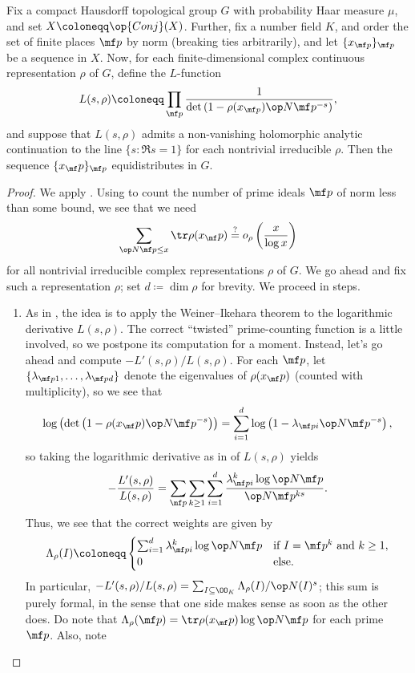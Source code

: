 \documentclass[../thesis.tex]{subfiles}
\begin{document}
\begin{proposition}[Serre] \label{prop:equi-by-l-func}
	Fix a compact Hausdorff topological group $G$ with probability Haar measure $\mu$, and set $X\coloneqq\op{Conj}(X)$. Further, fix a number field $K$, and order the set of finite places $\mf p$ by norm (breaking ties arbitrarily), and let $\{x_{\mf p}\}_{\mf p}$ be a sequence in $X$. Now, for each finite-dimensional complex continuous representation $\rho$ of $G$, define the $L$-function
	\[L(s,\rho)\coloneqq\prod_{\mf p}\frac1{\det\left(1-\rho(x_{\mf p})\op N\mf p^{-s}\right)},\]
	and suppose that $L(s,\rho)$ admits a non-vanishing holomorphic analytic continuation to the line $\{s:\Re s=1\}$ for each nontrivial irreducible $\rho$. Then the sequence $\{x_\mf p\}_{\mf p}$ equidistributes in $G$.
\end{proposition}
\begin{proof}
	We apply . Using  to count the number of prime ideals $\mf p$ of norm less than some bound, we see that we need
	\[\sum_{\op N\mf p\le x}\tr\rho(x_\mf p)\stackrel?=o_\rho\left(\frac x{\log x}\right)\]
	for all nontrivial irreducible complex representations $\rho$ of $G$. We go ahead and fix such a representation $\rho$; set $d\coloneqq\dim\rho$ for brevity. We proceed in steps.
	\begin{enumerate}
		\item As in , the idea is to apply the Weiner--Ikehara theorem to the logarithmic derivative $L(s,\rho)$. The correct ``twisted'' prime-counting function is a little involved, so we postpone its computation for a moment. Instead, let's go ahead and compute $-L'(s,\rho)/L(s,\rho)$. For each $\mf p$, let $\{\lambda_{\mf p1},\ldots,\lambda_{\mf pd}\}$ denote the eigenvalues of $\rho(x_\mf p)$ (counted with multiplicity), so we see that
		\[\log\left(\det\left(1-\rho(x_\mf p)\op N\mf p^{-s}\right)\right)=\sum_{i=1}^d\log\left(1-\lambda_{\mf pi}\op N\mf p^{-s}\right),\]
		so taking the logarithmic derivative as in  of $L(s,\rho)$ yields
		\[-\frac{L'(s,\rho)}{L(s,\rho)}=\sum_{\mf p}\sum_{k\ge1}\sum_{i=1}^{d}\frac{\lambda_{\mf pi}^k\log\op N\mf p}{\op N\mf p^{ks}}.\]
		Thus, we see that the correct weights are given by
		\[\Lambda_\rho(I)\coloneqq\begin{cases}
			\sum_{i=1}^d\lambda_{\mf pi}^k\log\op N\mf p & \text{if }I=\mf p^k\text{ and }k\ge1, \\
			0 & \text{else}.
		\end{cases}\]
		In particular, $-L'(s,\rho)/L(s,\rho)=\sum_{I\subseteq\OO_K}\Lambda_\rho(I)/\op N(I)^s$; this sum is purely formal, in the sense that one side makes sense as soon as the other does. Do note that $\Lambda_\rho(\mf p)=\tr\rho(x_\mf p)\log\op N\mf p$ for each prime $\mf p$. Also, note 
		

\end{enumerate}
\end{proof}
\end{document}
